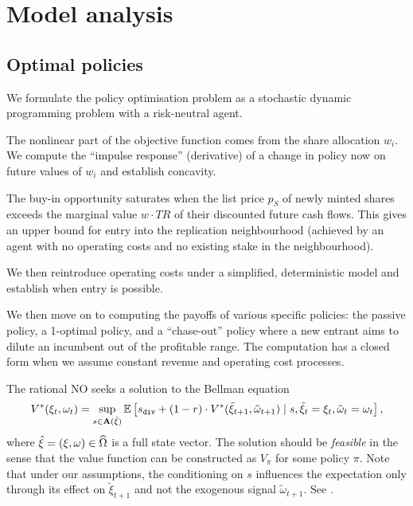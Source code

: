 \newpage
\section{Model analysis}



\subsection{Optimal policies}
\label{section:optimal}

\begin{notes}
  \item We formulate the policy optimisation problem as a stochastic dynamic programming problem with a risk-neutral agent.
  \item The nonlinear part of the objective function comes from the share allocation $w_i$. We compute the ``impulse response'' (derivative) of a change in policy now on future values of $w_i$ and establish concavity.
  \item The buy-in opportunity saturates when the list price $p_S$ of newly minted shares exceeds the marginal value $w\cdot TR$ of their discounted future cash flows. This gives an upper bound for entry into the replication neighbourhood (achieved by an agent with no operating costs and no existing stake in the neighbourhood).

  We then reintroduce operating costs under a simplified, deterministic model and establish when entry is possible.
  \item We then move on to computing the payoffs of various specific policies: the passive policy, a 1-optimal policy, and a ``chase-out'' policy where a new entrant aims to dilute an incumbent out of the profitable range. The computation has a closed form when we assume constant revenue and operating cost processes.
\end{notes}

The rational NO seeks a solution to the Bellman equation
\[
  V^*(\xi_t,\omega_t) = \sup_{s\in\mathbf{A}(\hat\xi)} 
    \mathbb{E}\left[ 
      s_\mathtt{div} + (1-r)\cdot V^*(\tilde\xi_{t+1},\tilde\omega_{t+1}) 
      \mid s ,\tilde\xi_t=\xi_t,\tilde\omega_t=\omega_t
    \right],
\]
where $\hat\xi = (\xi,\omega)\in\widehat{\Omega}$ is a full state vector. 
%
The solution should be \emph{feasible} in the sense that the value function can be constructed as $V_\pi$ for some policy $\pi$.
%
Note that under our assumptions, the conditioning on $s$ influences the expectation only through its effect on $\tilde\xi_{t+1}$ and not the exogenous signal $\tilde\omega_{t+1}$.
%
See \cite[Chap.~4]{sutton2018reinforcement}.

